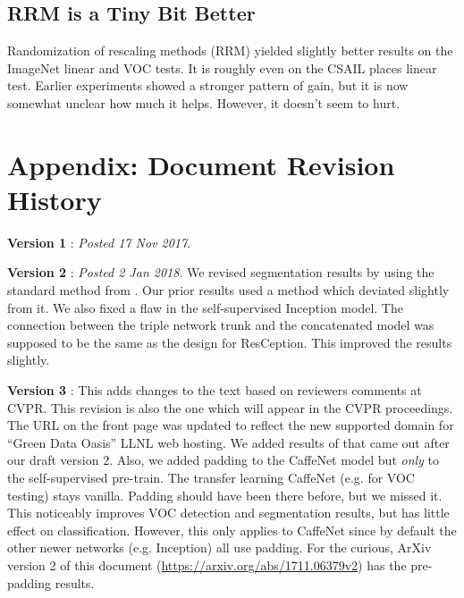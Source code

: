 \documentclass[10pt,twocolumn,letterpaper]{article}
\begin{document}
\subsection{RRM is a Tiny Bit Better}

Randomization of rescaling methods (RRM) yielded slightly better results on the ImageNet linear and VOC tests. It is roughly even on the CSAIL places linear test. Earlier experiments showed a stronger pattern of gain, but it is now somewhat unclear how much it helps. However, it doesn't seem to hurt. 

\section{Appendix: Document Revision History} \label{revision_appendix}{\bf Version 1} : \emph{Posted 17 Nov 2017}.

{\bf Version 2} : \emph{Posted 2 Jan 2018}. We revised segmentation results by using the standard method from \cite{Long15}. Our prior results used a method which deviated slightly from it. We also fixed a flaw in the self-supervised Inception model. The connection between the triple network trunk and the concatenated model was supposed to be the same as the design for ResCeption. This improved the results slightly. 

{\bf Version 3} : This adds changes to the text based on reviewers comments at CVPR. This revision is also the one which will appear in the CVPR proceedings. The URL on the front page was updated to reflect the new supported domain for ``Green Data Oasis'' LLNL web hosting. We added results of \cite{Kim18} that came out after our draft version 2. Also, we added padding to the CaffeNet model but \emph{only} to the self-supervised pre-train. The transfer learning CaffeNet (e.g. for VOC testing) stays vanilla. Padding should have been there before, but we missed it. This noticeably improves VOC detection and segmentation results, but has little effect on classification. However, this only applies to CaffeNet since by default the other newer networks (e.g. Inception) all use padding. For the curious, ArXiv version 2 of this document (\url{https://arxiv.org/abs/1711.06379v2}) has the pre-padding results.  
\end{document}
